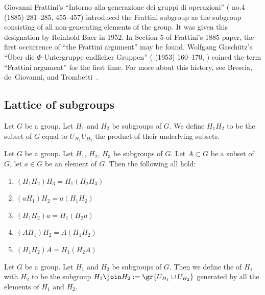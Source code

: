 \begin{remark}[History]
Giovanni Frattini's ``Intorno alla generazione dei gruppi di operazioni''
(  no.4 (1885) 281--285, 455--457)
introduced the Frattini subgroup as the subgroup consisting of all
non-generating elements of the group. It was given this designation by
Reinhold Baer in 1952. In Section 5 of Frattini's 1885 paper, the
first occurrence of ``the Frattini argument'' may be found.
Wolfgang Gasch\"{u}tz's ``\"{U}ber die $\Phi$-Untergruppe endlicher Gruppen''
(  (1953)
160--170, ) coined the term
``Frattini argument'' for the first time. For more about this history,
see Brescia, de~Giovanni, and Trombetti~\cite{brescia2017true}.
\end{remark}

\subsection{Lattice of subgroups}

\begin{definition}
Let $G$ be a group. Let $H_{1}$ and $H_{2}$ be subgroups of $G$.
We define $H_{1}H_{2}$ to be the subset of $G$ equal to
$U_{H_{1}}U_{H_{2}}$ the product of their underlying subsets.
\end{definition}

\begin{theorem}
Let $G$ be a group.
Let $H_{1}$, $H_{2}$, $H_{3}$ be subgroups of $G$.
Let $A\subset G$ be a subset of $G$, let $a\in G$ be an element of $G$.
Then the following all hold:
\begin{enumerate}
\item{} $(H_{1}H_{2})H_{3}=H_{1}(H_{2}H_{3})$
\item{} $(aH_{1})H_{2}=a(H_{1}H_{2})$
\item{} $(H_{1}H_{2})a=H_{1}(H_{2}a)$
\item{} $(AH_{1})H_{2}=A(H_{1}H_{2})$
\item{} $(H_{1}H_{2})A=H_{1}(H_{2}A)$
\end{enumerate}
\end{theorem}

\begin{definition}
Let $G$ be a group.
Let $H_{1}$ and $H_{2}$ be subgroups of $G$.
Then we define the  of $H_{1}$ with $H_{2}$ to be the
subgroup $H_{1}\join H_{2} := \gr{U_{H_{1}}\cup U_{H_{2}}}$ generated
by all the elements of $H_{1}$ and $H_{2}$. 
\end{definition}


